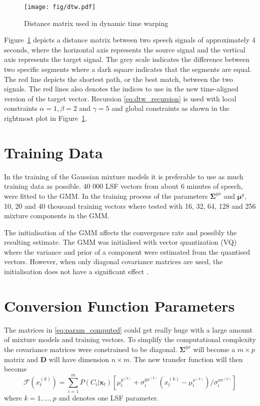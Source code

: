 \begin{figure}[htbp]
	\begin{center}
		\texttt{[image: fig/dtw.pdf]}
		\caption{Distance matrix used in dynamic time warping}
		\label{fig:dtw}
	\end{center}
\end{figure}
Figure~\ref{fig:dtw} depicts a distance matrix between two speech signals of approximately 4 seconds, where the horizontal axis represents the source signal and the vertical axis represents the target signal. The grey scale indicates the difference between two specific segments where a dark square indicates that the segments are equal. The red line depicts the shortest path, or the best match, between the two signals. The red lines also denotes the indices to use in the new time-aligned version of the target vector. Recursion \eqref{eq:dtw_recursion} is used with local constraints $\alpha=1, \beta=2$ and $\gamma=5$ and global constraints as shown in the rightmost plot in Figure~\ref{fig:dtw}.

\section{Training Data} %
\label{sec:training_data}
In the training of the Gaussian mixture models it is preferable to use as much training data as possible. 40 000 LSF vectors from about 6 minutes of speech, were fitted to the GMM. In the training process of the parameters $\mathbf{\Sigma}^{yx}$ and $\boldsymbol{\mu}^y$, 10, 20 and 40 thousand training vectors where tested with 16, 32, 64, 128 and 256 mixture components in the GMM.

The initialisation of the GMM affects the convergence rate and possibly the resulting estimate. The GMM was initialised with vector quantization (VQ) where the variance and prior of a component were estimated from the quantised vectors. However, when only diagonal covariance matrices are used, the initialisation does not have a significant effect \cite{reynolds93}.

\section{Conversion Function Parameters} %
\label{sec:conversion_function_parameters}
The matrices in \eqref{eq:param_computed} could get really huge with a large amount of mixture models and training vectors. To simplify the computational complexity the covariance matrices were constrained to be diagonal. $\mathbf{\Sigma}^{yx}$ will become a $m\times p$ matrix and $\mathbf{D}$ will have dimension $n\times m$. The new transfer function will then become
\begin{equation}
	\mathcal{F}(x_t^{(k)}) = \sum_{i=1}^{m}P(C_i \vert \mathbf{x}_t)[\mu_i^{y^{(k)}}+\sigma_i^{yx^{(k)}}  (x_t^{(k)}-\mu_i^{x^{(k)}})/\sigma_i^{xx^{(k)}}]
\end{equation}
where $k=1,\dots,p$ and denotes one LSF parameter.

